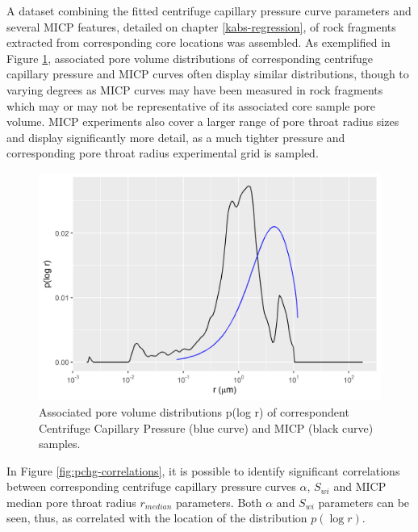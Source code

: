 \documentclass[english,msc,numbers]{coppe}
\begin{document}
  A dataset combining the fitted centrifuge capillary pressure curve parameters and several MICP features, detailed on chapter \ref{kabs-regression}, of rock fragments extracted from corresponding core locations was assembled. As exemplified in Figure \ref{fig:pcc-pchg}, associated pore volume distributions of corresponding centrifuge capillary pressure and MICP curves often display similar distributions, though to varying degrees as MICP curves may have been measured in rock fragments which may or may not be representative of its associated core sample pore volume. MICP experiments also cover a larger range of pore throat radius sizes and display significantly more detail, as a much tighter pressure and corresponding pore throat radius experimental grid is sampled.
  \begin{figure}
  
  {\centering \includegraphics[width=0.9\linewidth]{figure/2-11-pcc-pchg-pdf} 
  
  }
  
  \caption{Associated pore volume distributions p(log r) of correspondent Centrifuge Capillary Pressure (blue curve) and MICP (black curve) samples.}\label{fig:pcc-pchg}
  \end{figure}
  In Figure \ref{fig:pchg-correlations}, it is possible to identify significant correlations between corresponding centrifuge capillary pressure curves \(\alpha\), \(S_{wi}\) and MICP median pore throat radius \(r_{median}\) parameters. Both \(\alpha\) and \(S_{wi}\) parameters can be seen, thus, as correlated with the location of the distribution \(p(\log{r})\).
\end{document}

